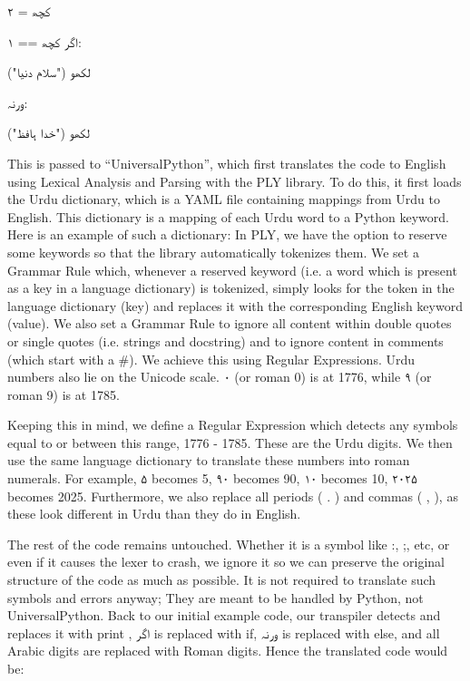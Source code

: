 \documentclass[conference]{IEEEtran}
\begin{document}
\begin{urdu} %
\urdufont 
کچھ = ۲

اگر کچھ == ۱:

\quad لکھو ("سلام دنیا")

ورنہ:

\quad لکھو ("خدا ہافظ")

\end{urdu} %

This is passed to “UniversalPython”, which first translates the code to English using Lexical Analysis and Parsing with the PLY library.
To do this, it first loads the Urdu dictionary, which is a YAML file containing mappings from Urdu to English. This dictionary is a mapping of each Urdu word to a Python keyword. Here is an example of such a dictionary:
In PLY, we have the option to reserve some keywords so that the library automatically tokenizes them. We set a Grammar Rule which, whenever a reserved keyword (i.e. a word which is present as a key in a language dictionary) is tokenized, simply looks for the token in the language dictionary (key) and replaces it with the corresponding English keyword (value).
We also set a Grammar Rule to ignore all content within double quotes or single quotes (i.e. strings and docstring) and to ignore content in comments (which start with a \#). We achieve this using Regular Expressions.
Urdu numbers also lie on the Unicode scale. \texturdu{۰} (or roman 0) is at 1776, while \texturdu{۹} (or roman 9) is at 1785.

Keeping this in mind, we define a Regular Expression which detects any symbols equal to or between this range, 1776 - 1785. These are the Urdu digits. We then use the same language dictionary to translate these numbers into roman numerals. For example, \texturdu{۵} becomes 5, \texturdu{۹۰} becomes 90, \texturdu{۱۰} becomes 10, \texturdu{۲۰۲۵} becomes 2025.
Furthermore, we also replace all periods ( . ) and commas ( , ), as these look different in Urdu than they do in English.

The rest of the code remains untouched. Whether it is a symbol like :, ;, etc, or even if it causes the lexer to crash, we ignore it so we can preserve the original structure of the code as much as possible. It is not required to translate such symbols and errors anyway; They are meant to be handled by Python, not UniversalPython. Back to our initial example code, our transpiler detects and replaces it with print , \texturdu{اگر} is replaced with if,
\texturdu{ورنہ} is replaced with else, and all Arabic digits are replaced with Roman digits. Hence the translated code would be:
\end{document}
